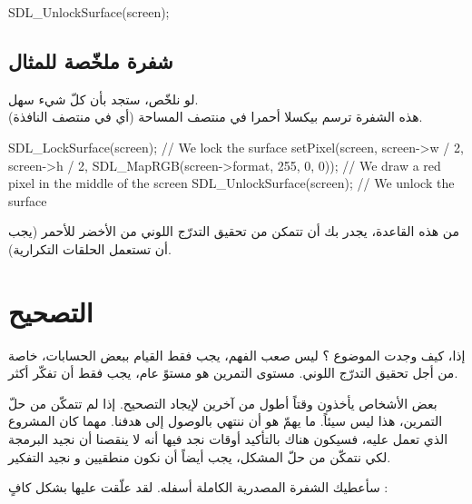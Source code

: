 \begin{Csource}
SDL_UnlockSurface(screen);
\end{Csource}

\subsection{شفرة  ملخّصة للمثال}

لو نلخّص، ستجد بأن كلّ شيء سهل.\\
هذه الشفرة ترسم بيكسلا أحمرا في منتصف المساحة
(أي في منتصف النافذة).

\begin{Csource}
SDL_LockSurface(screen); // We lock the surface
setPixel(screen, screen->w / 2, screen->h / 2, SDL_MapRGB(screen->format, 255, 0, 0)); // We draw a red pixel in the middle of the screen
SDL_UnlockSurface(screen); // We unlock the surface
\end{Csource}

من هذه القاعدة، يجدر بك أن تتمكن من تحقيق التدرّج اللوني من الأخضر للأحمر (يجب أن تستعمل الحلقات التكرارية).

\section{التصحيح}

إذا، كيف وجدت الموضوع ؟ ليس صعب الفهم، يجب فقط القيام ببعض الحسابات، خاصة من أجل تحقيق التدرّج اللوني. مستوى التمرين هو مستوً عام، يجب فقط أن تفكّر أكثر. 

بعض الأشخاص يأخذون وقتاً أطول من آخرين لإيجاد التصحيح. إذا لم تتمكّن من حلّ التمرين، هذا ليس سيئاً. ما يهمّ هو أن ننتهي بالوصول إلى هدفنا. مهما كان المشروع الذي تعمل عليه، فسيكون هناك بالتأكيد أوقات نجد فيها أنه لا ينقصنا أن نجيد البرمجة لكي نتمكّن من حلّ المشكل، يجب أيضاً أن نكون منطقيين و نجيد التفكير.

سأعطيك الشفرة المصدرية الكاملة أسفله. لقد علّقت عليها بشكل كافٍ :


